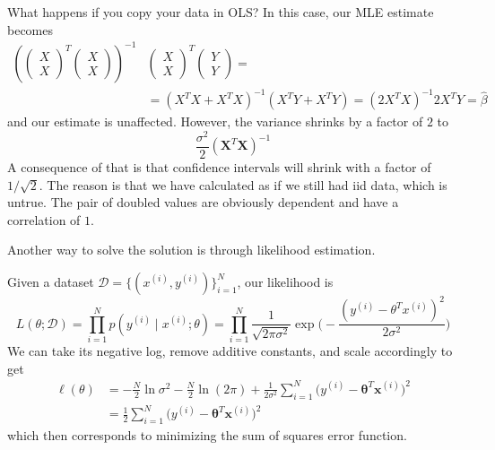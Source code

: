 \documentclass{article}
\begin{document}
    \begin{example}
      What happens if you copy your data in OLS? In this case, our MLE estimate becomes 
      \begin{align*}
          \left(\begin{pmatrix}X \\ X \end{pmatrix}^T \begin{pmatrix} X \\ X \end{pmatrix} \right )^{-1} & \begin{pmatrix} X \\ X  \end{pmatrix}^T \begin{pmatrix} Y \\ Y  \end{pmatrix}  =\\
      & = (X^T X + X^T X)^{-1} (X^T Y + X^T Y ) = (2 X^T X)^{-1} 2 X^T Y = \hat{\beta}
      \end{align*}
      and our estimate is unaffected. However, the variance shrinks by a factor of $2$ to 
      \begin{equation}
        \frac{\sigma^2}{2} (\mathbf{X}^T \mathbf{X})^{-1}
      \end{equation}
      A consequence of that is that confidence intervals will shrink with a factor of $1/\sqrt{2}$. The reason is that we have calculated as if we still had iid data, which is untrue. The pair of doubled values are obviously dependent and have a correlation of $1$. 
    \end{example}

    Another way to solve the solution is through likelihood estimation. 

    \begin{theorem}
      Given a dataset $\mathcal{D} = \{(x^{(i)}, y^{(i)})\}_{i=1}^N$, our likelihood is 
      \[L(\theta ; \mathcal{D}) = \prod_{i=1}^N p(y^{(i)} \mid x^{(i)}; \theta) = \prod_{i=1}^N \frac{1}{\sqrt{2 \pi \sigma^2}} \exp \bigg( -\frac{(y^{(i)} - \theta^T x^{(i)})^2}{2 \sigma^2} \bigg)\]
      We can take its negative log, remove additive constants, and scale accordingly to get 
      \begin{align*}
          \ell (\theta) & = -\frac{N}{2} \ln{\sigma^2} - \frac{N}{2} \ln(2 \pi) + \frac{1}{2 \sigma^2} \sum_{i=1}^N \big(y^{(i)} - \boldsymbol{\theta}^T \mathbf{x}^{(i)} \big)^2 \\
          & =\frac{1}{2} \sum_{i=1}^N \big(y^{(i)} - \boldsymbol{\theta}^T \mathbf{x}^{(i)} \big)^2 
      \end{align*}
      which then corresponds to minimizing the sum of squares error function. 
    \end{theorem}
\end{document}
